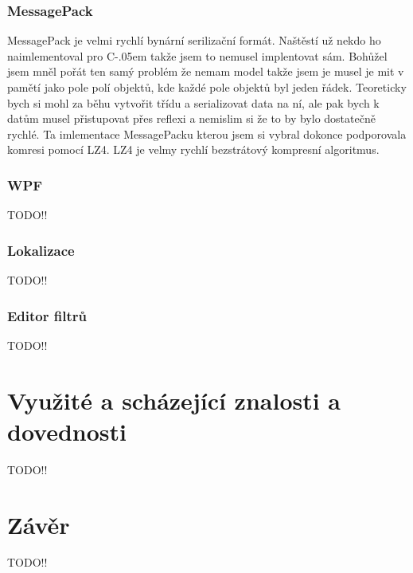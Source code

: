 \documentclass[czech,bachelor,dept460,male,csharp]{diploma}
\newcommand{\Csharp}{%
  {\settoheight{\dimen0}{C}C\kern-.05em \resizebox{!}{\dimen0}{\raisebox{\depth}{\#}}}}
\begin{document}
		\subsubsection{MessagePack}
			MessagePack\cite{mpSpec} je velmi rychlí bynární serilizační formát. Naštěstí už nekdo ho naimlementoval pro {\Csharp} takže jsem to nemusel implentovat sám. Bohůžel jsem mněl pořát ten samý problém že nemam model takže jsem je musel je mit v pamětí jako pole polí objektů, kde každé pole objektů byl jeden řádek. Teoreticky bych si mohl za běhu vytvořit třídu a serializovat data na ní, ale pak bych k datům musel přistupovat přes reflexi a nemislim si že to by bylo dostatečně rychlé. Ta imlementace MessagePacku\cite{mpImpl} kterou jsem si vybral dokonce podporovala komresi pomocí LZ4. LZ4\cite{l4z} je velmy rychlí bezstrátový kompresní algoritmus.
		\subsubsection{WPF}
TODO!!

		\subsubsection{Lokalizace}
TODO!!

		\subsubsection{Editor filtrů}
TODO!!
\section{Využité a scházející znalosti a dovednosti}
TODO!!
\section{Závěr}
TODO!!


\printbibliography[title={Literatura}, heading=bibintoc]


\end{document}
